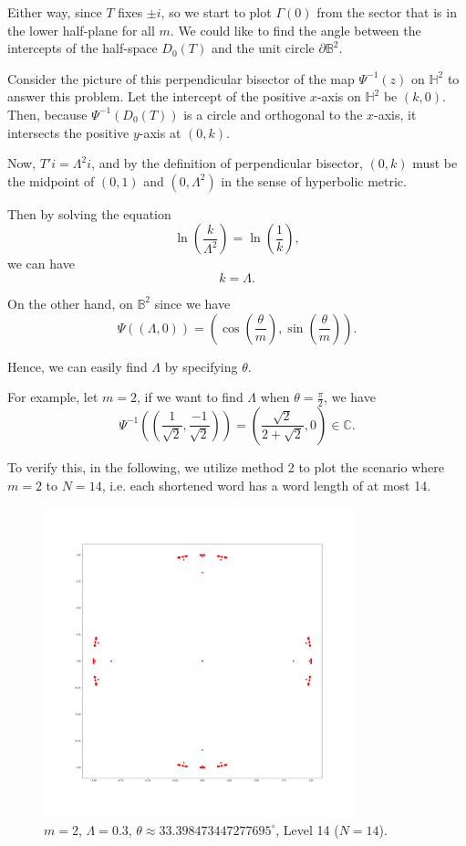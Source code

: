 \documentclass[12pt,oneside]{sfsuthesis}
\theoremstyle{plain} %
\theoremstyle{definition}  %
\theoremstyle{remark}  %
\theoremstyle{plain}
\begin{document}
{Either way, since $T$ fixes $\pm i$, so we start to plot $\Gamma(0)$ from the sector that is in the lower half-plane for all $m$. We could like to find the angle between the intercepts of the half-space $D_{0}(T)$ and the unit circle $\partial\mathbb{B}^2$.


Consider the picture of this perpendicular bisector of the map $\Psi^{-1}(z)$ on $\mathbb{H}^2$ to answer this problem. Let the intercept of the positive $x$-axis on $\mathbb{H}^2$ be $(k,0)$. Then, because $\Psi^{-1} (D_0(T))$ is a circle and orthogonal to the $x$-axis, it intersects the positive $y$-axis at $(0,k)$.

Now, $T'i=\Lambda^2 i$, and by the definition of perpendicular bisector, $(0,k)$ must be the midpoint of $(0,1)$ and $(0,\Lambda^2)$ in the sense of hyperbolic metric.

Then by solving the equation
$$
\ln\left(\frac{k}{\Lambda^2} \right)=\ln\left(\frac{1}{k}\right),
$$
we can have
$$
k=\Lambda.
$$

On the other hand, on $\mathbb{B}^2$ since we have 
$$
\Psi((\Lambda,0)) = \left(\cos\left(\frac{\theta}{m}\right), \sin\left(\frac{\theta}{m}\right)\right).
$$

Hence, we can easily find $\Lambda$ by specifying $\theta$.

For example, let $m=2$, if we want to find $\Lambda$ when $\theta=\frac{\pi}{2}$, we have
$$
\Psi^{-1}\left(\left(\frac{1}{\sqrt{2}}, \frac{-1}{\sqrt{2}}\right)\right)
=\left(\frac{\sqrt{2}}{2+\sqrt{2}},0\right)\in\mathbb{C}.
$$


To verify this, in the following, we utilize method 2 to plot the scenario where $m=2$ to $N=14$, i.e. each shortened word has a word length of at most 14.


\begin{figure}[H]
\centering
\includegraphics[width=0.8\textwidth]{Lambda=0.3,m=2,N=14.png}
\caption{$m=2$, $\Lambda=0.3$, $\theta\approx 33.398473447277695^{\circ}$, Level 14 ($N=14$).}
\end{figure}

}
\end{document}

